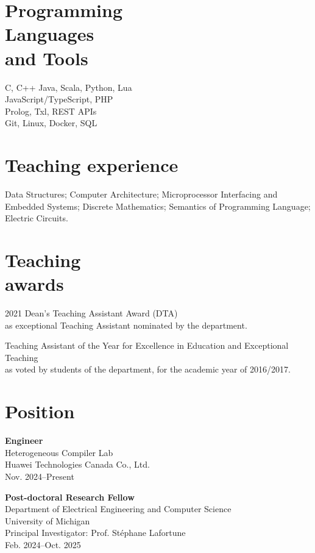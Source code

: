 \documentclass[margin]{res}
\begin{document}
\begin{resume}
\section{Programming\\Languages\\and Tools}
C, C++ Java, Scala, Python, Lua\\
JavaScript/TypeScript, PHP\\
Prolog, Txl, REST APIs\\
Git, Linux, Docker, SQL

\section{Teaching experience}
Data Structures;
Computer Architecture;
Microprocessor Interfacing and Embedded Systems;
Discrete Mathematics;
Semantics of Programming Language;
Electric Circuits.

\section{Teaching\\awards}
2021 Dean's Teaching Assistant Award (DTA)\\
as exceptional Teaching Assistant nominated by the department.

Teaching Assistant of the Year for Excellence in Education and Exceptional Teaching\\
as voted by students of the department, for the academic year of 2016/2017.

\section{Position}

\textbf{Engineer}\\
Heterogeneous Compiler Lab\\
Huawei Technologies Canada Co., Ltd.\\
\null\qquad Nov. 2024--Present

\textbf{Post-doctoral Research Fellow}\\
Department of Electrical Engineering and Computer Science\\
University of Michigan\\
\null\qquad Principal Investigator: Prof. Stéphane Lafortune\\
\null\qquad Feb. 2024--Oct. 2025



\end{resume}
\end{document}
